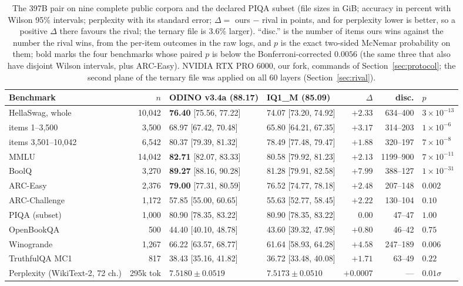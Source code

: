 \documentclass[10pt]{article} %
\begin{document}
\begin{table}[t]
\centering
\small
\setlength{\tabcolsep}{3pt}
\footnotesize
\begin{tabular}{@{}l r l l r r l@{}}
\toprule
Benchmark & $n$ & ODINO v3.4a (88.17) & IQ1\_M (85.09) & $\Delta$ & disc. & $p$ \\
\midrule
HellaSwag, whole & 10{,}042 & \textbf{76.40} [75.56, 77.22] & 74.07 [73.20, 74.92] & $+2.33$ & 634--400 & $3{\times}10^{-13}$ \\
\quad items 1--3,500 & 3{,}500 & 68.97 [67.42, 70.48] & 65.80 [64.21, 67.35] & $+3.17$ & 314--203 & $1{\times}10^{-6}$ \\
\quad items 3,501--10,042 & 6{,}542 & 80.37 [79.39, 81.32] & 78.49 [77.48, 79.47] & $+1.88$ & 320--197 & $7{\times}10^{-8}$ \\
MMLU & 14{,}042 & \textbf{82.71} [82.07, 83.33] & 80.58 [79.92, 81.23] & $+2.13$ & 1199--900 & $7{\times}10^{-11}$ \\
BoolQ & 3{,}270 & \textbf{89.27} [88.16, 90.28] & 81.28 [79.91, 82.58] & $+7.99$ & 388--127 & $1{\times}10^{-31}$ \\
ARC-Easy & 2{,}376 & \textbf{79.00} [77.31, 80.59] & 76.52 [74.77, 78.18] & $+2.48$ & 207--148 & $0.002$ \\
ARC-Challenge & 1{,}172 & 57.85 [55.00, 60.65] & 55.63 [52.77, 58.45] & $+2.22$ & 130--104 & $0.10$ \\
PIQA (subset) & 1{,}000 & 80.90 [78.35, 83.22] & 80.90 [78.35, 83.22] & $0.00$ & 47--47 & $1.00$ \\
OpenBookQA & 500 & 44.40 [40.10, 48.78] & 43.60 [39.32, 47.98] & $+0.80$ & 46--42 & $0.75$ \\
Winogrande & 1{,}267 & 66.22 [63.57, 68.77] & 61.64 [58.93, 64.28] & $+4.58$ & 247--189 & $0.006$ \\
TruthfulQA MC1 & 817 & 38.43 [35.16, 41.82] & 36.72 [33.48, 40.08] & $+1.71$ & 63--49 & $0.22$ \\
Perplexity (WikiText-2, 72 ch.) & 295k tok & $7.5180 \pm 0.0519$ & $7.5173 \pm 0.0510$ & $+0.0007$ & --- & $0.01\sigma$ \\
\bottomrule
\end{tabular}
\caption{The 397B pair on nine complete public corpora and the declared PIQA
subset (file sizes in
GiB; accuracy in percent with Wilson 95\% intervals; perplexity with its
standard error; $\Delta =$ ours $-$ rival in points, and for perplexity lower
is better, so a positive $\Delta$ there favours the rival; the ternary file is
3.6\% larger). ``disc.'' is the number of items ours wins against the number
the rival wins, from the per-item outcomes in the raw logs, and $p$ is the
exact two-sided McNemar probability on them; bold marks the four benchmarks
whose paired $p$ is below the Bonferroni-corrected $0.0056$ (the same three
that also have disjoint Wilson intervals, plus ARC-Easy). NVIDIA RTX PRO 6000,
our fork, commands of
Section~\ref{sec:protocol}; the second plane of the ternary file was applied on
all 60 layers (Section~\ref{sec:rival}).}
\label{tab:bench397}
\end{table}
\end{document}
